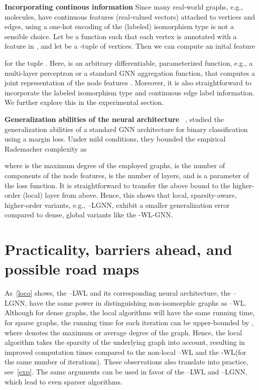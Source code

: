 \documentclass{article}
\newcommand{\xhdr}[1]{{\noindent\bfseries #1}}
\theoremstyle{definition}
\newcommand{\kwl}{-\textsf{WL}\xspace}
\newcommand{\deltakwl}{--\textsf{WL}\xspace}
\newcommand{\localkwl}{--\textsf{LWL}\xspace}
\newcommand{\pluskwl}{--\textsf{LWL}\xspace}
\newcommand{\localkwln}{--\textsf{LGNN}\xspace}
\newcommand{\kwln}{-\textsf{WL-GNN}\xspace}
\begin{document}
\xhdr{Incorporating continous information}\label{contfeat}
Since many real-world graphs, e.g., molecules, have continuous features (real-valued vectors) attached to vertices and edges, using a one-hot encoding of the (labeled) isomorphism type is not a sensible choice. Let  be a function such that each vertex  is annotated with a feature  in , and let  be a -tuple of vertices. Then we can compute an inital feature

for the tuple . Here,  is an arbitrary differentiable, parameterized function, e.g., a multi-layer perceptron or a standard GNN aggregation function, that computes a joint representation of the  node features . Moreover, it is also straightforward to incorporate the labeled isomorphism type and continuous edge label information. We further explore this in the experimental section.


\xhdr{Generalization abilities of the  neural architecture}
\citeauthor{Gar+2020}~\cite{Gar+2020}, studied the generalization abilities of a standard GNN architecture for binary classification using a margin loss. Under mild conditions, they bounded the empirical Rademacher complexity as

where  is the maximum degree of the employed graphs,  is the number of components of the node features,  is the number of layers, and  is a parameter of the loss function. It is straightforward to transfer the above bound to the higher-order (local) layer from above. Hence, this shows that local, sparsity-aware, higher-order variants, e.g., \localkwln, exhibit a smaller generalization error compared to dense, global variants like the \kwln.


\section{Practicality, barriers ahead, and possible road maps}\label{prac_app}

As~\cref{loco} shows, the \pluskwl and its corresponding neural architecture, the \localkwln, have the same power in distinguishing non-isomorphic graphs as \deltakwl. Although for dense graphs, the local algorithms will have the same running time, for sparse graphs, the running time for each iteration can be upper-bounded by , where  denotes the maximum or average degree of the graph. Hence, the local algorithm takes the sparsity of the underlying graph into account, resulting in improved computation times compared to the non-local \deltakwl and the \kwl (for the same number of iterations). These observations also translate into practice, see~\cref{exp}. The same arguments can be used in favor of the \localkwl and \localkwln, which lead to even sparser algorithms. 
\end{document}
